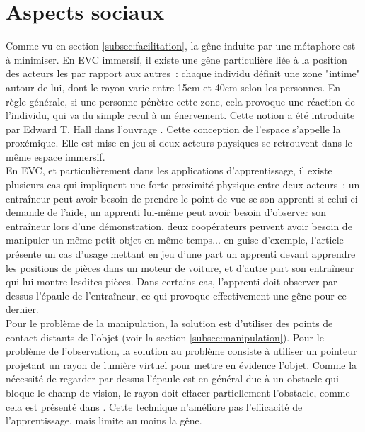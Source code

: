 \documentclass[11pt]{article}
\begin{document}
\section{Aspects sociaux}
\label{sec:social}

Comme vu en section \ref{subsec:facilitation}, la gêne induite par une métaphore est à minimiser. En EVC immersif, il existe une gêne particulière liée à la position des acteurs les par rapport aux autres~: chaque individu définit une zone "intime" autour de lui, dont le rayon varie entre 15cm et 40cm selon les personnes. En règle générale, si une personne pénètre cette zone, cela provoque une réaction de l'individu, qui va du simple recul à un énervement. Cette notion a été introduite par Edward T. Hall dans l'ouvrage \cite{proxemics}. Cette conception de l'espace s'appelle la proxémique. Elle est mise en jeu si deux acteurs physiques se retrouvent dans le même espace immersif.
\\

En EVC, et particulièrement dans les applications d'apprentissage, il existe plusieurs cas qui impliquent une forte proximité physique entre deux acteurs~: un entraîneur peut avoir besoin de prendre le point de vue se son apprenti si celui-ci demande de l'aide, un apprenti lui-même peut avoir besoin d'observer son entraîneur lors d'une démonstration, deux coopérateurs peuvent avoir besoin de manipuler un même petit objet en même temps... en guise d'exemple, l'article \cite{show-through} présente un cas d'usage mettant en jeu d'une part un apprenti devant apprendre les positions de pièces dans un moteur de voiture, et d'autre part son entraîneur qui lui montre lesdites pièces. Dans certains cas, l'apprenti doit observer par dessus l'épaule de l'entraîneur, ce qui provoque effectivement une gêne pour ce dernier.
\\

Pour le problème de la manipulation, la solution est d'utiliser des points de contact distants de l'objet (voir la section \ref{subsec:manipulation}). Pour le problème de l'observation, la solution au problème consiste à utiliser un pointeur projetant un rayon de lumière virtuel pour mettre en évidence l'objet. Comme la nécessité de regarder par dessus l'épaule est en général due à un obstacle qui bloque le champ de vision, le rayon doit effacer partiellement l'obstacle, comme cela est présenté dans \cite{show-through}. Cette technique n'améliore pas l'efficacité de l'apprentissage, mais limite au moins la gêne.
\end{document}
